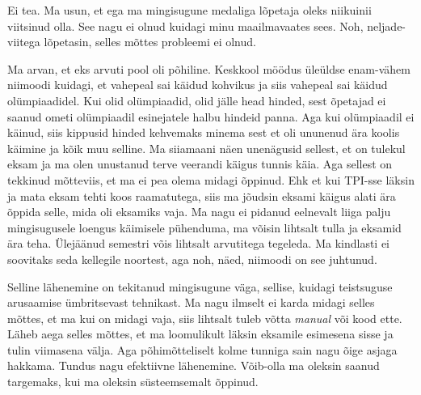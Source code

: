 
Ei tea. Ma usun, et ega ma mingisugune medaliga lõpetaja oleks niikuinii 
viitsinud olla. See nagu ei olnud kuidagi minu maailmavaates sees. Noh, 
neljade-viitega lõpetasin, selles mõttes probleemi ei olnud.


Ma arvan, et eks arvuti pool oli põhiline. Keskkool möödus üleüldse enam-vähem 
niimoodi  kuidagi, et vahepeal sai käidud kohvikus ja siis vahepeal sai käidud 
olümpiaadidel. Kui olid olümpiaadid, olid jälle head hinded, sest õpetajad ei 
saanud ometi olümpiaadil esinejatele halbu hindeid panna. Aga kui olümpiaadil 
ei käinud, siis kippusid hinded kehvemaks minema sest et oli ununenud ära 
koolis käimine ja kõik muu selline. Ma siiamaani näen unenägusid sellest, et on 
tulekul eksam ja ma olen unustanud terve veerandi käigus tunnis käia. Aga 
sellest on  tekkinud  mõtteviis, et ma ei pea olema midagi õppinud. Ehk et kui 
TPI-sse läksin ja mata eksam tehti koos raamatutega, siis ma jõudsin eksami 
käigus alati ära õppida selle, mida oli eksamiks vaja. Ma nagu ei pidanud  
eelnevalt liiga palju mingisugusele loengus käimisele pühenduma, ma võisin 
lihtsalt tulla ja eksamid ära teha. Ülejäänud semestri võis lihtsalt arvutitega 
tegeleda. Ma kindlasti ei soovitaks seda kellegile noortest, aga noh, näed, 
niimoodi on see juhtunud. 

Selline lähenemine on tekitanud mingisugune väga, sellise, kuidagi teistsuguse 
arusaamise ümbritsevast tehnikast. Ma nagu  ilmselt ei karda midagi selles 
mõttes, et ma kui on midagi vaja, siis lihtsalt tuleb võtta \emph{manual}  või 
kood ette. Läheb aega selles mõttes, et ma loomulikult läksin eksamile 
esimesena sisse ja tulin viimasena välja. Aga  põhimõtteliselt kolme tunniga 
sain nagu õige asjaga hakkama. Tundus nagu efektiivne lähenemine. Võib-olla ma  
oleksin saanud targemaks, kui ma oleksin süsteemsemalt õppinud. 


